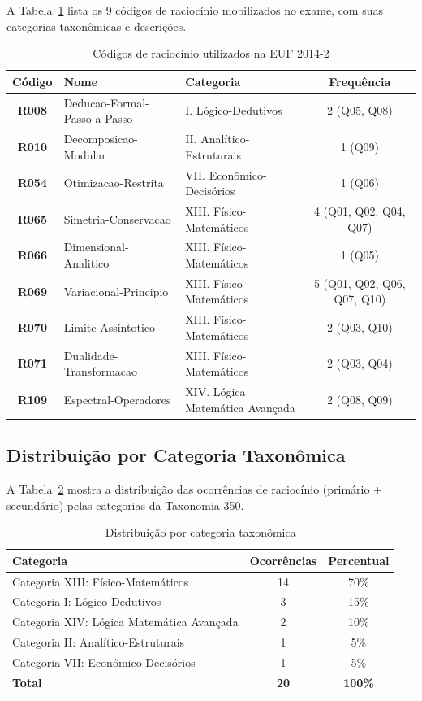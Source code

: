 \documentclass[12pt,a4paper]{article}
\newcommand{\rcode}[1]{\textcolor{azulprof}{\textbf{#1}}}
\begin{document}
A Tabela~\ref{tab:rcodes} lista os 9 códigos de raciocínio mobilizados
no exame, com suas categorias taxonômicas e descrições.

\begin{table}[H]
\centering
\caption{Códigos de raciocínio utilizados na EUF 2014-2}
\label{tab:rcodes}
\begin{tabular}{cllc}
\toprule
\textbf{Código} & \textbf{Nome} & \textbf{Categoria} & \textbf{Frequência} \\
\midrule
\rcode{R008} & Deducao-Formal-Passo-a-Passo
  & I. Lógico-Dedutivos & 2 (Q05, Q08) \\
\rcode{R010} & Decomposicao-Modular
  & II. Analítico-Estruturais & 1 (Q09) \\
\rcode{R054} & Otimizacao-Restrita
  & VII. Econômico-Decisórios & 1 (Q06) \\
\rcode{R065} & Simetria-Conservacao
  & XIII. Físico-Matemáticos & 4 (Q01, Q02, Q04, Q07) \\
\rcode{R066} & Dimensional-Analitico
  & XIII. Físico-Matemáticos & 1 (Q05) \\
\rcode{R069} & Variacional-Principio
  & XIII. Físico-Matemáticos & 5 (Q01, Q02, Q06, Q07, Q10) \\
\rcode{R070} & Limite-Assintotico
  & XIII. Físico-Matemáticos & 2 (Q03, Q10) \\
\rcode{R071} & Dualidade-Transformacao
  & XIII. Físico-Matemáticos & 2 (Q03, Q04) \\
\rcode{R109} & Espectral-Operadores
  & XIV. Lógica Matemática Avançada & 2 (Q08, Q09) \\
\bottomrule
\end{tabular}
\end{table}

\subsection{Distribuição por Categoria Taxonômica}

A Tabela~\ref{tab:categorias} mostra a distribuição das ocorrências de
raciocínio (primário + secundário) pelas categorias da Taxonomia 350.

\begin{table}[H]
\centering
\caption{Distribuição por categoria taxonômica}
\label{tab:categorias}
\begin{tabular}{lcc}
\toprule
\textbf{Categoria} & \textbf{Ocorrências} & \textbf{Percentual} \\
\midrule
Categoria XIII: Físico-Matemáticos & 14 & 70\% \\
Categoria I: Lógico-Dedutivos & 3 & 15\% \\
Categoria XIV: Lógica Matemática Avançada & 2 & 10\% \\
Categoria II: Analítico-Estruturais & 1 & 5\% \\
Categoria VII: Econômico-Decisórios & 1 & 5\% \\
\midrule
\textbf{Total} & \textbf{20} & \textbf{100\%} \\
\bottomrule
\end{tabular}
\end{table}
\end{document}
